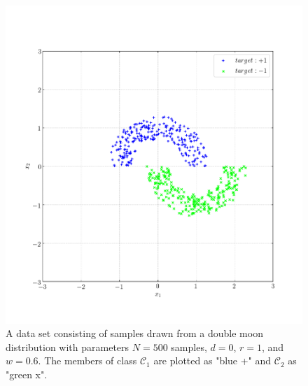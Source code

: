 \documentclass[conference]{IEEEtran}
\begin{document}
\begin{figure}[p!]
\centerline{\includegraphics[trim=0 0 0 0, clip, width=\columnwidth]{Figure_2.png}}
\caption{A data set consisting of samples drawn from a double moon distribution with parameters $N=500$ samples, $d=0$, $r=1$, and $w=0.6$. The members of class $\mathscr{C}_1$ are plotted as "blue +" and $\mathscr{C}_2$ as "green x". }
\label{fig:doublemoon}
\end{figure}

\clearpage
\end{document}
